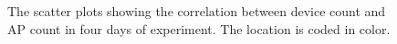 \begin{figure}[H]
\begin{adjustwidth}{-3cm}{}
{{    }
  }
  \end{adjustwidth}
  \caption[The scatter plots of the correlation between device count and \ac{AP}.]
  {The scatter plots showing the correlation between device count and \ac{AP} count in four days of experiment. The location is coded in color.}
  \label{fig:ap-dc-scatterplot}
\end{figure}

